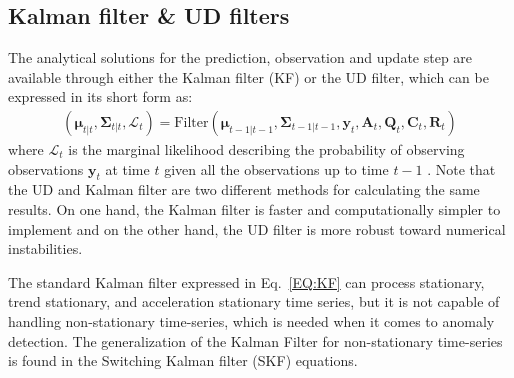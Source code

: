 \subsection{Kalman filter \& UD filters}
\label{SS:KFUD}
The analytical solutions for the prediction, observation and update step are available through either the Kalman filter (KF) or the UD filter, which can be expressed in its short form as:
\begin{equation}
    \begin{split}
      (\bm{\mu}_{t|t},\bm{\Sigma}_{t|t}, \mathcal{L}_{t}) = \text{Filter}(\bm{\mu}_{t-1|t-1},\bm{\Sigma}_{t-1|t-1},\mathbf{y}_{t}, \mathbf{A}_{t},  \mathbf{Q}_{t},   \mathbf{C}_{t},  \mathbf{R}_{t})
      \end{split}
\label{EQ:KF}
\end{equation}
where $\mathcal{L}_{t}$ is the marginal likelihood describing the probability of observing observations $\mathbf{y}_{t}$ at time $t$ given all the observations up to time $t-1$ \cite{sarkka2013bayesian}. 
Note that the UD and Kalman filter are two different methods for calculating the same results. On one hand, the Kalman filter is faster and computationally simpler to implement and on the other hand, the UD filter is more robust toward numerical instabilities.   


The standard Kalman filter expressed in Eq.~\ref{EQ:KF} can process stationary, trend stationary, and acceleration stationary time series, but it is not capable of handling non-stationary time-series, which is needed when it comes to anomaly detection.
The generalization of the Kalman Filter for non-stationary time-series is found in the Switching Kalman filter (SKF) equations.

